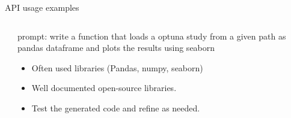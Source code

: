 \documentclass[
  aspectratio=1610,
]{beamer}
\begin{document}
\begin{frame}{API usage examples}
  \begin{columns}[T,totalwidth=\textwidth]
    \begin{column}{0.6\textwidth}
    \end{column}
    \begin{column}{0.37\textwidth}
      prompt: write a function that loads a optuna study from a given path as pandas dataframe and plots the results using seaborn

      \begin{itemize}
        \item Often used libraries (Pandas, numpy, seaborn)
        \item Well documented open-source libraries.
        \item Test the generated code and refine as needed.
      \end{itemize}
    \end{column}
  \end{columns}
\end{frame}
\end{document}
